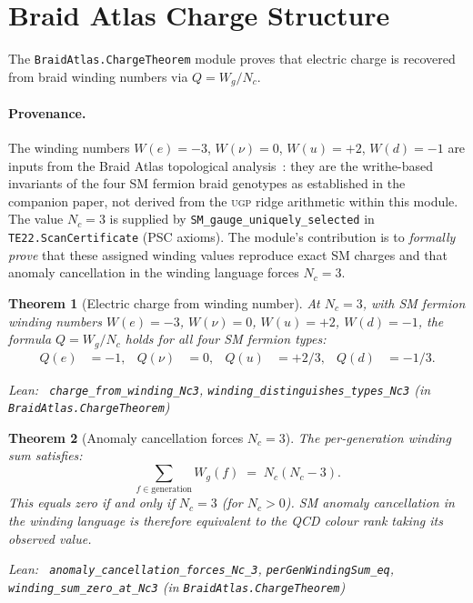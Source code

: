\documentclass[11pt,a4paper]{article}
\newenvironment{leanref}%
  {\par\smallskip\noindent\begingroup\raggedright\textup{Lean:}~}%
  {\par\endgroup}
\newtheorem{theorem}{Theorem}[section]
\theoremstyle{definition}
\newcommand{\ugp}{\textsc{ugp}}
\begin{document}
\section{Braid Atlas Charge Structure}\label{sec:braidatlas}

The \texttt{BraidAtlas.ChargeTheorem} module proves that electric charge
is recovered from braid winding numbers via $Q = W_g/N_c$.

\paragraph{Provenance.}
The winding numbers $W(e) = -3$, $W(\nu) = 0$, $W(u) = +2$, $W(d) = -1$
are inputs from the Braid Atlas topological analysis~\cite{SpivackBraidAtlas}:
they are the writhe-based invariants of the four SM fermion braid genotypes
as established in the companion paper, not derived from the \ugp{} ridge
arithmetic within this module.
The value $N_c = 3$ is supplied by \texttt{SM\_gauge\_uniquely\_selected}
in \texttt{TE22.ScanCertificate} (PSC axioms).  The module's contribution
is to \emph{formally prove} that these assigned winding values reproduce exact
SM charges and that anomaly cancellation in the winding language
forces $N_c = 3$.

\begin{theorem}[Electric charge from winding number]\label{thm:charge-winding}
At $N_c = 3$, with SM fermion winding numbers
$W(e) = -3$, $W(\nu) = 0$, $W(u) = +2$, $W(d) = -1$,
the formula $Q = W_g / N_c$ holds for all four SM fermion types:
\begin{align*}
  Q(e) &= -1, & Q(\nu) &= 0, & Q(u) &= +2/3, & Q(d) &= -1/3.
\end{align*}

\begin{leanref} \lstinline|charge_from_winding_Nc3|,
\lstinline|winding_distinguishes_types_Nc3|
\textup{(in \texttt{BraidAtlas.ChargeTheorem})}
\end{leanref}
\end{theorem}

\begin{theorem}[Anomaly cancellation forces $N_c = 3$]\label{thm:anomaly-nc}
The per-generation winding sum satisfies:
\[
  \sum_{f \in \text{generation}} W_g(f) \;=\; N_c(N_c - 3).
\]
This equals zero if and only if $N_c = 3$ (for $N_c > 0$).
SM anomaly cancellation in the winding language is therefore equivalent to
the QCD colour rank taking its observed value.

\begin{leanref} \lstinline|anomaly_cancellation_forces_Nc_3|,
\lstinline|perGenWindingSum_eq|,
\lstinline|winding_sum_zero_at_Nc3|
\textup{(in \texttt{BraidAtlas.ChargeTheorem})}
\end{leanref}
\end{theorem}
\end{document}
